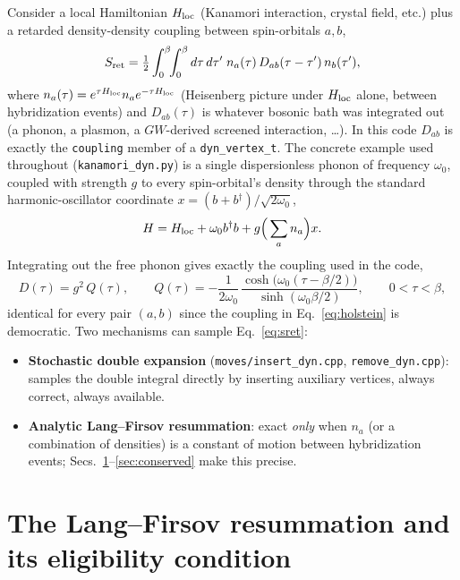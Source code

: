 \documentclass[a4paper,12pt]{article}
\renewcommand{\t}{\ensuremath{\tau}}
\newcommand{\w}{\ensuremath{\omega}}
\newcommand{\Hloc}{\ensuremath{H_{\rm loc}}}
\newcommand{\ndag}{\ensuremath{^\dagger}}
\begin{document}
Consider a local Hamiltonian $\Hloc$ (Kanamori interaction, crystal field, etc.) plus a
retarded density-density coupling between spin-orbitals $a,b$,
\begin{equation}
  S_{\rm ret} = \tfrac12 \int_0^\beta\!\!\int_0^\beta d\t\, d\t'\;
  n_a(\t)\, D_{ab}(\t-\t')\, n_b(\t'),
  \label{eq:sret}
\end{equation}
where $n_a(\t) = e^{\t \Hloc} n_a e^{-\t \Hloc}$ (Heisenberg picture under $\Hloc$
alone, between hybridization events) and $D_{ab}(\t)$ is whatever bosonic bath was
integrated out (a phonon, a plasmon, a $GW$-derived screened interaction, \ldots). In
this code $D_{ab}$ is exactly the \texttt{coupling} member of a
\texttt{dyn\_vertex\_t}. The concrete example used throughout
(\texttt{kanamori\_dyn.py}) is a single dispersionless phonon of frequency $\w_0$,
coupled with strength $g$ to every spin-orbital's density through the standard
harmonic-oscillator coordinate $x=(b+b\ndag)/\sqrt{2\w_0}$,
\begin{equation}
  H = \Hloc + \w_0 b\ndag b + g\Big(\sum_a n_a\Big) x .
  \label{eq:holstein}
\end{equation}
Integrating out the free phonon gives exactly the coupling used in the code,
\begin{equation}
  D(\t) = g^2\, Q(\t), \qquad
  Q(\t) = -\frac{1}{2\w_0}\,\frac{\cosh\!\big(\w_0(\t-\beta/2)\big)}{\sinh(\w_0\beta/2)},
  \qquad 0<\t<\beta,
  \label{eq:Qtau}
\end{equation}
identical for every pair $(a,b)$ since the coupling in Eq.~\eqref{eq:holstein} is
democratic. Two mechanisms can sample Eq.~\eqref{eq:sret}:
\begin{itemize}
  \item \textbf{Stochastic double expansion} (\texttt{moves/insert\_dyn.cpp},
    \texttt{remove\_dyn.cpp}): samples the double integral directly by inserting
    auxiliary vertices, always correct, always available.
  \item \textbf{Analytic Lang--Firsov resummation}: exact \emph{only} when $n_a$ (or a
    combination of densities) is a constant of motion between hybridization events;
    Secs.~\ref{sec:eligibility}--\ref{sec:conserved} make this precise.
\end{itemize}

\section{The Lang--Firsov resummation and its eligibility condition}
\label{sec:eligibility}
\end{document}
